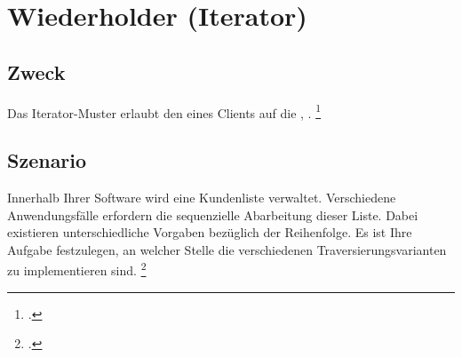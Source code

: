 \documentclass{lehramt-informatik-haupt}
\begin{document}

\chapter{Wiederholder (Iterator)}

\begin{liQuellen}
\item \cite{wiki:iterator}
\item \cite[PDF Seite 219-231]{gof}
\item \cite[Seite 56-59]{eilebrecht}
\item \cite[Seite 106-116]{siebler}
\end{liQuellen}

%

\section{Zweck}

Das Iterator-Muster erlaubt den  eines
Clients auf die , .
\footcite[Seite 56]{eilebrecht}

%

\section{Szenario}

Innerhalb Ihrer Software wird eine Kundenliste verwaltet. Verschiedene
Anwendungsfälle erfordern die sequenzielle Abarbeitung dieser Liste.
Dabei existieren unterschiedliche Vorgaben bezüglich der Reihenfolge. Es
ist Ihre Aufgabe festzulegen, an welcher Stelle die verschiedenen
Traversierungsvarianten zu implementieren sind.
\footcite[Seite 56]{eilebrecht}

%
\end{document}
